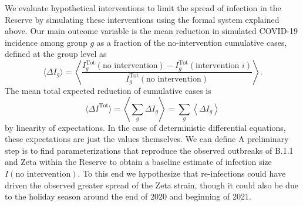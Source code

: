 \documentclass[
  letterpaper,
  abstract]{scrartcl}
\begin{document}
We evaluate hypothetical interventions to limit the spread of
infection in the Reserve by simulating these interventions using the formal
system explained above. Our main outcome variable is the mean reduction 
in simulated COVID-19 incidence among group $g$ as a fraction of the no-intervention
cumulative cases, defined at the group level as
\begin{equation}
  \langle \Delta I_g \rangle = \left\langle \frac{I^\mathrm{Tot}_g(\text{no intervention}) -
    I^\mathrm{Tot}_g(\text{intervention } i)}{I^\mathrm{Tot}_g(\text{no
  intervention})} \right\rangle.
  \label{eq:DeltaI_byGroup}
\end{equation}
\noindent
The mean total expected reduction of cumulative cases is 
\begin{equation}
  \langle \Delta I^\mathrm{Tot} \rangle = \left \langle \sum_g \Delta I_g \right \rangle = \sum_g \left \langle \Delta I_g \right \rangle 
  \label{eq:DeltaI}
\end{equation}
\noindent
by linearity of expectations.
In the case of deterministic differential equations, these expectations are just the
values themselves.  We can define A preliminary step is to find parameterizations
that reproduce the observed outbreaks of B.1.1 and Zeta within the Reserve to obtain
a baseline estimate of infection size $I(\text{no intervention})$.  To this end we
hypothesize that re-infections could have driven the observed greater spread of the
Zeta strain, though it could also be due to the holiday season around the end of
2020 and beginning of 2021. 
\end{document}
